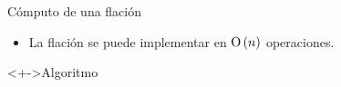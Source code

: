 \documentclass[spanish]{beamer}
\begin{document}
\begin{frame}{Cómputo de una flación}
  \begin{itemize}[<+->]
    \item La flación se puede implementar en $\operatorname{O}\left( n \right)$ operaciones.
  \end{itemize}
  \begin{block}<+->{Algoritmo}
    \begin{algorithm}[H]
    \end{algorithm}
  \end{block}
\end{frame}
\end{document}
